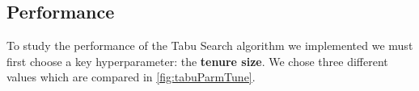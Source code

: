 
\subsection{Performance}

To study the performance of the Tabu Search algorithm we implemented we must first choose a key hyperparameter: the \textbf{tenure size}.
We chose three different values which are compared in \figurename{ \ref{fig:tabuParmTune}}.


